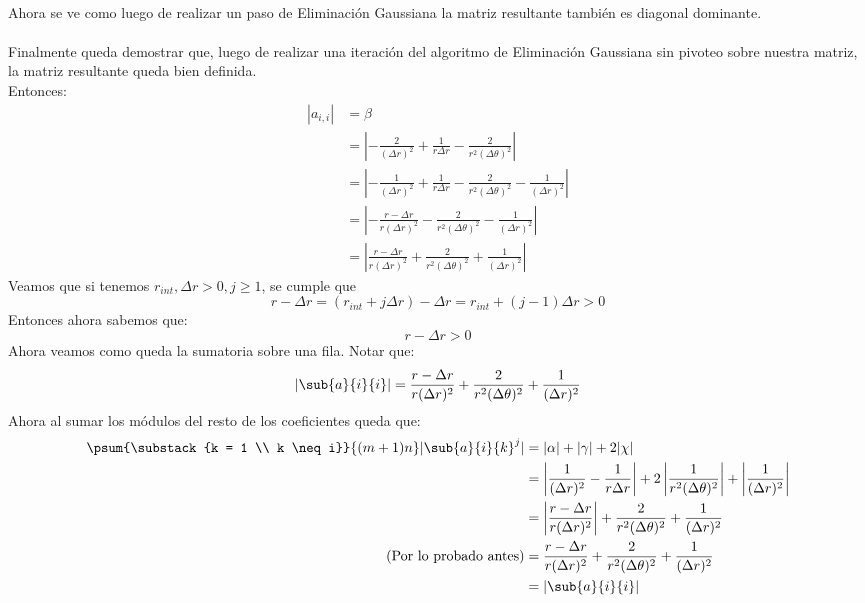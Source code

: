 \documentclass[12pt]{article}
\begin{document}
\paragraph{} Ahora se ve como luego de realizar un paso de Eliminación Gaussiana la matriz resultante también es diagonal dominante.
\paragraph{} Finalmente queda demostrar que, luego de realizar una iteración del algoritmo de Eliminación Gaussiana sin pivoteo sobre nuestra matriz, la matriz resultante queda bien definida. \\ %
Entonces:
\[\begin{split}
  | a_{i,i} | & = \beta \\
              & = \left \vert - \frac{2}{(\Delta r)^2} + \frac{1}{r \Delta r} - \frac{2}{r^2 (\Delta \theta)^2} \right \vert \\
              & = \left \vert - \frac{1}{(\Delta r)^2} + \frac{1}{r \Delta r} - \frac{2}{r^2 (\Delta \theta)^2} - \frac{1}{(\Delta r)^2} \right \vert \\
              & = \left \vert - \frac{r - \Delta r}{r (\Delta r)^2} - \frac{2}{r^2 (\Delta \theta)^2} - \frac{1}{(\Delta r)^2} \right \vert \\
              & = \left \vert \frac{r - \Delta r}{r (\Delta r)^2} + \frac{2}{r^2 (\Delta \theta)^2} + \frac{1}{(\Delta r)^2} \right \vert
\end{split}\]
Veamos que si tenemos \(r_{int}, \Delta r > 0, j \geq 1\), se cumple que
\[
  r - \Delta r = (r_{int} + j \Delta r) - \Delta r = r_{int} + (j - 1) \Delta r > 0
\]
Entonces ahora sabemos que:
\[
  r - \Delta r > 0
\]
Ahora veamos como queda la sumatoria sobre una fila. Notar que:  
\[
  | \sub{a}{i}{i} | = \frac{r - \Delta r}{r (\Delta r)^2} + \frac{2}{r^2 (\Delta \theta)^2} + \frac{1}{(\Delta r)^2}
\]
Ahora al sumar los módulos del resto de los coeficientes queda que:
\[\begin{split}
  \psum{\substack{k = 1 \\ k \neq i}}{(m+1)n} |\sub{a}{i}{k}^{j}| & = |\alpha| + |\gamma| + 2 |\chi| \\
                                                                  & = \left \vert \frac{1}{(\Delta r)^2} - \frac{1}{r \Delta r} \right \vert + 2 \left \vert \frac{1}{r^2 (\Delta \theta)^2} \right \vert + \left \vert \frac{1}{(\Delta r)^2} \right \vert \\
                                                                       & = \left \vert \frac{r - \Delta r}{r (\Delta r)^2} \right \vert + \frac{2}{r^2 (\Delta \theta)^2} + \frac{1}{(\Delta r)^2} \\
                                                                       \text{(Por lo probado antes)}
                                                                       & = \frac{r - \Delta r}{r (\Delta r)^2} + \frac{2}{r^2 (\Delta \theta)^2} + \frac{1}{(\Delta r)^2} \\
                                                                       & = | \sub{a}{i}{i} |
\end{split}\] %
\end{document}
